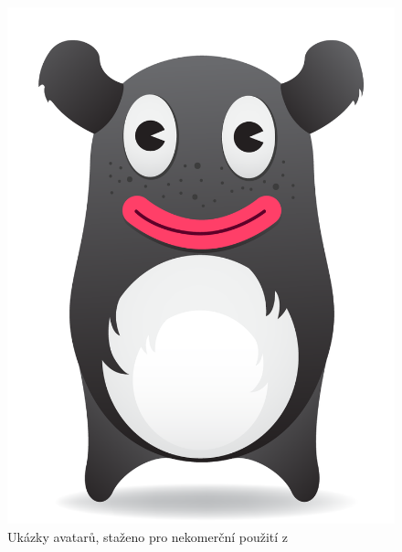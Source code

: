 \documentclass[twoside]{ctuthesis}
\theoremstyle{plain}
\theoremstyle{definition}
\theoremstyle{note}
\begin{document}
\begin{figure}[]
    \caption{Ukázky avatarů, staženo pro nekomerční použití z \cite{pngegg}}
    \centering
    \includegraphics[width=(0.25\textwidth)]{images/avatars/avatar-black.png}
    \hspace{0.1\textwidth}

\end{figure}
\end{document}
